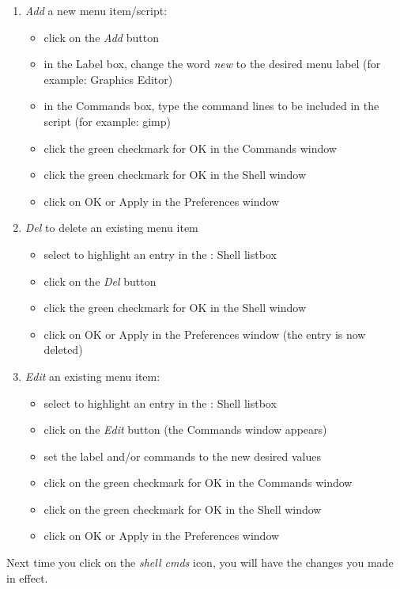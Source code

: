 \begin{enumerate}
	\item \textit{Add} a new menu item/script:
	\begin{itemize}[noitemsep]
		\item click on the \textit{Add} button
		\item in the Label box, change the word \textit{new} to the desired menu label (for example: Graphics Editor)
		\item in the Commands box, type the command lines to be included in the script (for example: gimp)
		\item click the green checkmark for OK in the Commands window
		\item click the green checkmark for OK in the Shell window
		\item click on OK or Apply in the Preferences window
	\end{itemize}
	\item \textit{Del} to delete an existing menu item
	\begin{itemize}[noitemsep]
		\item select to highlight an entry in the \CGG{}: Shell listbox
		\item click on the \textit{Del }button
		\item click the green checkmark for OK in the Shell window
		\item click on OK or Apply in the Preferences window (the entry is now deleted)
	\end{itemize}
	\item \textit{Edit} an existing menu item:
	\begin{itemize}[noitemsep]
		\item select to highlight an entry in the \CGG{}: Shell listbox
		\item click on the \textit{Edit} button (the Commands window appears)
		\item set the label and/or commands to the new desired values
		\item click on the green checkmark for OK in the Commands window
		\item click on the green checkmark for OK in the Shell window
		\item click on OK or Apply in the Preferences window
	\end{itemize} 
\end{enumerate}
	
Next time you click on the \textit{shell cmds} icon, you will have the changes you made in effect.


